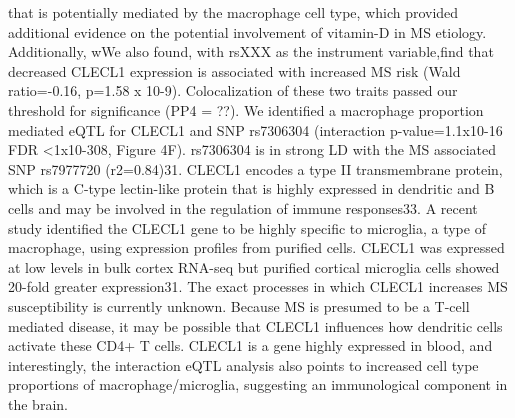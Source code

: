 that is potentially mediated by the macrophage cell type, which provided additional evidence on the potential involvement of vitamin-D in MS etiology. Additionally, wWe also found, with rsXXX as the instrument variable,find that decreased CLECL1 expression is associated with increased MS risk (Wald ratio=-0.16, p=1.58 x 10-9). Colocalization of these two traits passed our threshold for significance (PP4 = ??). We identified a macrophage proportion mediated eQTL for CLECL1 and SNP rs7306304 (interaction p-value=1.1x10-16 FDR <1x10-308, Figure 4F). rs7306304 is in strong LD with the MS associated SNP rs7977720 (r2=0.84)31. CLECL1 encodes a type II transmembrane protein, which is a C-type lectin-like protein that is highly expressed in dendritic and B cells and may be involved in the regulation of immune responses33. A recent study identified the CLECL1 gene to be highly specific to microglia, a type of macrophage, using expression profiles from purified cells. CLECL1 was expressed at low levels in bulk cortex RNA-seq but purified cortical microglia cells showed 20-fold greater expression31. The exact processes in which CLECL1 increases MS susceptibility is currently unknown. Because MS is presumed to be a T-cell mediated disease, it may be possible that CLECL1 influences how dendritic cells activate these CD4+ T cells. CLECL1 is a gene highly expressed in blood, and interestingly, the interaction eQTL analysis also points to increased cell type proportions of macrophage/microglia, suggesting an immunological component in the brain.

